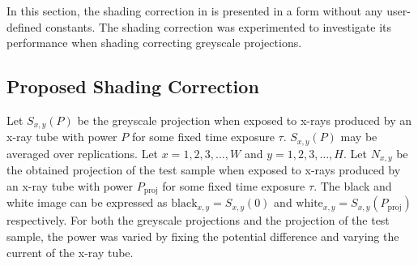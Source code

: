 In this section, the shading correction in \cite{seibert1998flat} is presented in a form without any user-defined constants. The shading correction was experimented to investigate its performance when shading correcting greyscale projections.

\subsection{Proposed Shading Correction}

Let $S_{x,y}(P)$ be the greyscale projection when exposed to x-rays produced by an x-ray tube with power $P$ for some fixed time exposure $\tau$. $S_{x,y}(P)$ may be averaged over replications. Let $x=1,2,3,\dotsc, W$ and $y=1,2,3,\dotsc,H$. Let $N_{x,y}$ be the obtained projection of the test sample when exposed to x-rays produced by an x-ray tube with power $P_\text{proj}$ for some fixed time exposure $\tau$. The black and white image can be expressed as $\text{black}_{x,y}=S_{x,y}(0)$ and $\text{white}_{x,y}=S_{x,y}(P_\text{proj})$ respectively. For both the greyscale projections and the projection of the test sample, the power was varied by fixing the potential difference and varying the current of the x-ray tube.

